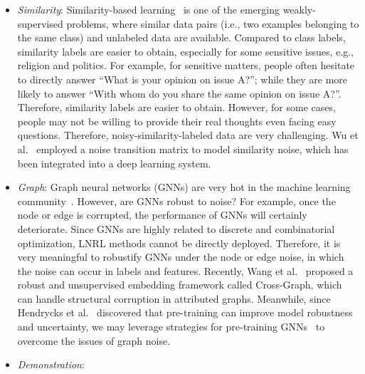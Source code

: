 \begin{itemize}[leftmargin=*]
There are two seminal works. Specifically, to handle WDA, Liu et al.~ proposed the Butterfly framework, 
which maintains four deep networks simultaneously. 
Butterfly can obtain high-quality domain-invariant representations (DIR) and target-specific representations (TSR) in an iterative manner.
Meanwhile, Yu et al.~ proposed a novel Denoising Conditional Invariant Component (DCIC) framework, 
which provably ensures extracting invariant representations and estimating the label distribution in the target domain with no bias.
\item \textit{Similarity}:
Similarity-based learning~ is one of the emerging weakly-supervised problems, where similar data pairs (i.e., two examples belonging to the same class) and unlabeled data are available. Compared to class labels, similarity labels are easier to obtain, especially for some sensitive issues, e.g., religion and politics. For example, for sensitive matters, people often hesitate to directly answer ``What is your opinion on issue A?''; while they are more likely to answer ``With whom do you share the same opinion on issue A?''. Therefore, similarity labels are easier to obtain. However, for some cases, people may not be willing to provide their real thoughts even facing easy questions. Therefore, noisy-similarity-labeled data are very challenging. Wu et al.~ employed a noise transition matrix to model similarity noise, which has been integrated into a deep learning system.
\item \textit{Graph}:
Graph neural networks (GNNs) are very hot in the machine learning community~. 
However, are GNNs robust to noise? For example, once the node or edge is corrupted, the performance of GNNs will certainly deteriorate. Since GNNs are highly related to discrete and combinatorial optimization, LNRL methods cannot be directly deployed. Therefore, it is very meaningful to robustify GNNs under the node or edge noise, in which the noise can occur in labels and features. Recently, Wang et al.~ proposed a robust and unsupervised embedding framework called Cross-Graph, which can handle structural corruption in attributed graphs. Meanwhile, since Hendrycks et al.~ discovered that pre-training can improve  model robustness and uncertainty, we may leverage strategies for pre-training GNNs~ to overcome the issues of graph noise.
\item \textit{Demonstration}:

\end{itemize}
